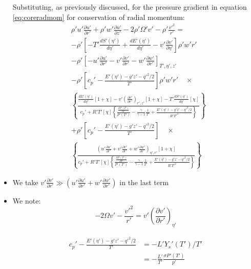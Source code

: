 \documentclass[preprint, prX]{revtex4}
\newcommand{\dd}[2]{\frac{d#1}{d#2}}
\newcommand{\pd}[2]{\frac{\partial#1}{\partial#2}}
\newcommand{\tpd}[3]{\left( \frac{\partial#1}{\partial#2} \right)_{#3}}
\newcommand{\gogmo}{\frac{\gamma}{\gamma-1}}
\begin{document}
\begin{itemize}
Substituting, as previously discussed, for the pressure gradient in equation \eqref{eq:coreradmom} for conservation of radial momentum:
\begin{equation}
\begin{split}
&\rho'u'\pd{u'}{r'} + \rho' w' \pd{u'}{z'} - 2 \rho' \Omega'v' - \rho'\frac{v'^2}{r'} = \\
&-\rho'\left[ -T' \dd{S'(\eta')}{\eta'} +\dd{E'(\eta')}{\eta'}- v' \pd{v'}{\eta'} \right] \rho' w' r' \\
& - \rho' \left[ -u'\pd{u'}{r'} -v'\pd{v'}{r'} -w'\pd{w'}{r'}\right]_{T',\eta',z'} \\
& - \rho' \left[ c_p' - \frac{E'(\eta') - g'z' - q'^2/2}{T'}\right]\rho' w' r' \quad \times \\
&\left\{ \frac{\dd{E'(\eta')}{\eta'}\left[ 1+\chi\right] - v'\tpd{v'}{r'}{r',z'}\left[ 1 + \chi \right] - T' \dd{S'(\eta')}{\eta'}[\chi]}{c_p'+R'T'[\chi] \left\{ \frac{\dd{P'(T')}{T'}}{P'(T')} -\gogmo \frac{1}{T'} + \frac{E'(\eta') - g'z' - q'^2/2}{R'T'^2} \right\} }\right\} \\
&+ \rho' \left[ c_p' - \frac{E'(\eta') - g'z'-q'^2/2}{T'}\right] \quad \times \\
& \left\{ \frac{ \left( u'\pd{u'}{r'} +v'\pd{v'}{r'} + w'\pd{w'}{r'} \right)_{\eta',r'} [1+\chi] }{c_p' + R'T'[\chi] \left\{ \frac{\dd{P'(T')}{T'}}{P'(T')} -\gogmo \frac{1}{T'} + \frac{E'(\eta') - g'z' - q'^2/2}{R'T'^2}\right \} }	\right\}
\end{split}
\end{equation}

\item
We take $v'\pd{v'}{r'} \gg \left( u' \pd{u'}{r'} + w'\pd{w'}{r'}\right)$ in the last term

\item
We note:
\begin{equation}
-2 \Omega v' - \frac{v'^2}{r'} = v'\tpd{v'}{r'}{\eta'}
\end{equation}

\begin{equation}
\begin{split}
c_p' - \frac{E'(\eta') - g' z' - q'^2/2}{T'} &= -L' Y_s'(T')/T' \\
&= -\frac{L'}{T'}\frac{\sigma P'(T')}{p'}
\end{split}
\end{equation}


\end{itemize}
\end{document}
